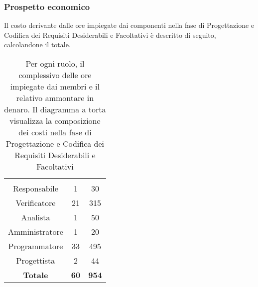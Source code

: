 \subsubsection{Prospetto economico}
Il costo derivante dalle ore impiegate dai componenti nella fase di Progettazione e Codifica dei Requisiti Desiderabili e Facoltativi è descritto di seguito, calcolandone il totale.

\begin{table}[H]
	{\setlength{\parindent}{0cm}
		\begin{minipage}{.43\textwidth}
			\begin{tabular}{ccc}
				\rowcolorhead
				\headertitle{Ruolo} & \headertitle{Ore} & \headertitle{Costo(€)}\\
				Responsabile & 1 & 30\\
				Verificatore & 21 & 315\\
				Analista & 1 & 50\\
				Amministratore & 1 & 20\\
				Programmatore & 33 & 495\\
				Progettista & 2 & 44\\
				\hline
				\textbf{Totale} & \textbf{60} & \textbf{954}\\
			\end{tabular}
		\end{minipage}%
		\begin{minipage}{.57\textwidth}
	\end{minipage} }
	\caption[Prospetto economico della fase di Progettazione e Codifica dei Requisiti Desiderabili e Facoltativi]{Per ogni ruolo, il complessivo delle ore impiegate dai membri e il relativo ammontare in denaro. Il diagramma a torta visualizza la composizione dei costi nella fase di Progettazione e Codifica dei Requisiti Desiderabili e Facoltativi}
\end{table}







